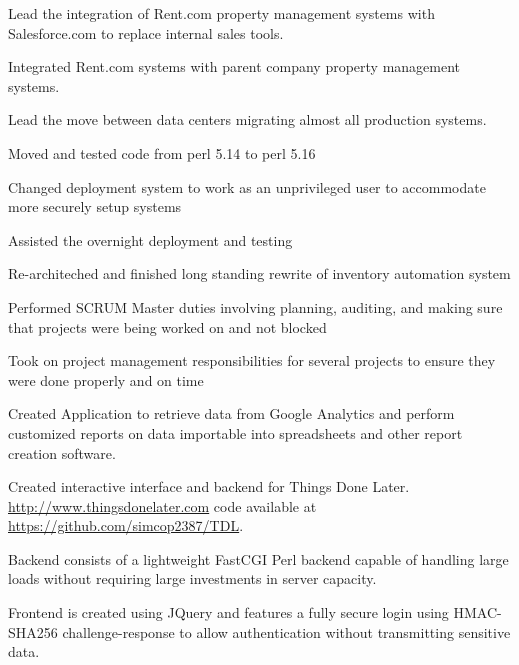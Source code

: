 \documentclass[table,tmargin=1in,bmargin=1in,letterpaper]{resume}
\begin{document}
\begin{compactitem}
\item Lead the integration of Rent.com property management systems with Salesforce.com to replace internal sales tools.
\item Integrated Rent.com systems with parent company property management systems.
\item Lead the move between data centers migrating almost all production systems.
  \begin{compactitem}
  \item Moved and tested code from perl 5.14 to perl 5.16
  \item Changed deployment system to work as an unprivileged user to accommodate more securely setup systems
  \item Assisted the overnight deployment and testing
  \end{compactitem}
\item Re-architeched and finished long standing rewrite of inventory automation system
\item Performed SCRUM Master duties involving planning, auditing, and making sure that projects were being worked on and not blocked
\item Took on project management responsibilities for several projects to ensure they were done properly and on time
\end{compactitem}

\begin{compactitem}
\item Created Application to retrieve data from Google Analytics and perform customized reports on data importable into spreadsheets and other report creation software.
\end{compactitem}

\begin{compactitem}
\item Created interactive interface and backend for Things Done Later.  \url{http://www.thingsdonelater.com} code available at \url{https://github.com/simcop2387/TDL}.
\item Backend consists of a lightweight FastCGI Perl backend capable of handling large loads without requiring large investments in server capacity.
\item Frontend is created using JQuery and features a fully secure login using HMAC-SHA256 challenge-response to allow authentication without transmitting sensitive data.
\end{compactitem}
\end{document}

